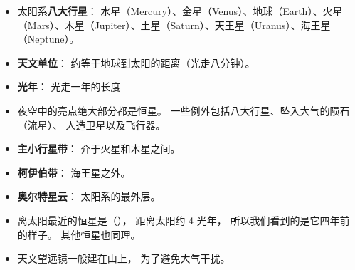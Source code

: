 
\begin{issues}
\issueDraft
\end{issues}

\begin{itemize}
\item 太阳系\textbf{八大行星}： 水星（Mercury）、金星（Venus）、地球（Earth）、火星（Mars）、木星（Jupiter）、土星（Saturn）、天王星（Uranus）、海王星（Neptune）。
\item \textbf{天文单位}： 约等于地球到太阳的距离（光走八分钟）。
\item \textbf{光年}： 光走一年的长度
\item 夜空中的亮点绝大部分都是恒星。 一些例外包括八大行星、坠入大气的陨石（流星）、 人造卫星以及飞行器。
\item \textbf{主小行星带}： 介于火星和木星之间。
\item \textbf{柯伊伯带}： 海王星之外。
\item \textbf{奥尔特星云}： 太阳系的最外层。
\item 离太阳最近的恒星是（）， 距离太阳约 4 光年， 所以我们看到的是它四年前的样子。 其他恒星也同理。
\item 天文望远镜一般建在山上， 为了避免大气干扰。
\end{itemize}
